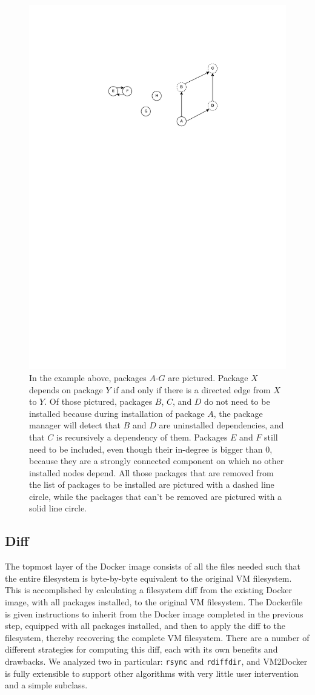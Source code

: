 \begin{figure}[h]
\centering

    \includegraphics[width=.6\textwidth]{depgraph.pdf}
    \caption{In the example above, packages $A$-$G$ are pictured. Package $X$ depends on package $Y$ if and only if there is a directed edge from $X$ to $Y$. Of those pictured, packages $B$, $C$, and $D$ do not need to be installed because during installation of package $A$, the package manager will detect that $B$ and $D$ are uninstalled dependencies, and that $C$ is recursively a dependency of them. Packages $E$ and $F$ still need to be included, even though their in-degree is bigger than 0, because they are a strongly connected component on which no other installed nodes depend. All those packages that are removed from the list of packages to be installed are pictured with a dashed line circle, while the packages that can't be removed are pictured with a solid line circle.}
   \label{fig:depgraph}
\end{figure}

\subsection{Diff}
\label{sec:diff}
The topmost layer of the Docker image consists of all the files needed such that the entire filesystem is byte-by-byte equivalent to the original VM filesystem. This is accomplished by calculating a filesystem diff from the existing Docker image, with all packages installed, to the original VM filesystem. The Dockerfile is given instructions to inherit from the Docker image completed in the previous step, equipped with all packages installed, and then to apply the diff to the filesystem, thereby recovering the complete VM filesystem. There are a number of different strategies for computing this diff, each with its own benefits and drawbacks. We analyzed two in particular: \texttt{rsync} and \texttt{rdiffdir}, and VM2Docker is fully extensible to support other algorithms with very little user intervention and a simple subclass.


